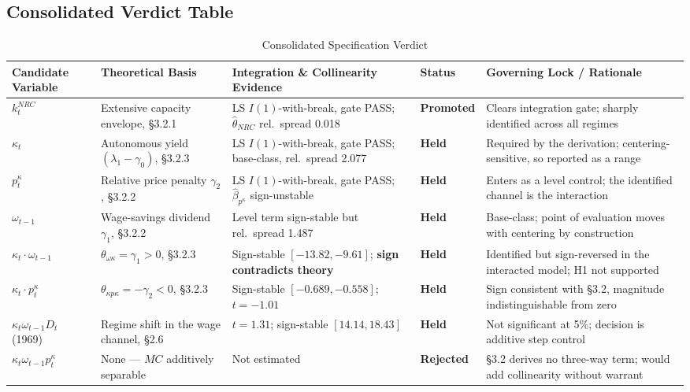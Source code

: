 \documentclass[11pt,a4paper]{article}
\begin{document}
\FloatBarrier
\begin{landscape}
\section{Consolidated Verdict Table}

\begin{table}[H]
\centering
\caption{Consolidated Specification Verdict}
\label{tab:verdict}
\small
\begin{tabular}{p{3.6cm}p{4.4cm}p{6.4cm}p{2.2cm}p{6.0cm}}
\toprule
Candidate Variable & Theoretical Basis & Integration \& Collinearity Evidence & Status & Governing Lock / Rationale \\
\midrule
$k^{NRC}_t$ & Extensive capacity envelope, \S3.2.1 & LS $I(1)$-with-break, gate PASS; $\hat{\theta}_{NRC}$ rel.\ spread 0.018 & \textbf{Promoted} & Clears integration gate; sharply identified across all regimes \\
$\kappa_t$ & Autonomous yield $(\lambda_1-\gamma_0)$, \S3.2.3 & LS $I(1)$-with-break, gate PASS; base-class, rel.\ spread 2.077 & \textbf{Held} & Required by the derivation; centering-sensitive, so reported as a range \\
$p^{\kappa}_t$ & Relative price penalty $\gamma_2$, \S3.2.2 & LS $I(1)$-with-break, gate PASS; $\hat{\beta}_{p^{\kappa}}$ sign-unstable & \textbf{Held} & Enters as a level control; the identified channel is the interaction \\
$\omega_{t-1}$ & Wage-savings dividend $\gamma_1$, \S3.2.2 & Level term sign-stable but rel.\ spread 1.487 & \textbf{Held} & Base-class; point of evaluation moves with centering by construction \\
$\kappa_t \cdot \omega_{t-1}$ & $\theta_{\omega\kappa}=\gamma_1>0$, \S3.2.3 & Sign-stable $[-13.82, -9.61]$; \textbf{sign contradicts theory} & \textbf{Held} & Identified but sign-reversed in the interacted model; H1 not supported \\
$\kappa_t \cdot p^{\kappa}_t$ & $\theta_{\kappa p\kappa}=-\gamma_2<0$, \S3.2.3 & Sign-stable $[-0.689, -0.558]$; $t=-1.01$ & \textbf{Held} & Sign consistent with \S3.2, magnitude indistinguishable from zero \\
$\kappa_t\omega_{t-1}D_t$ (1969) & Regime shift in the wage channel, \S2.6 & $t=1.31$; sign-stable $[14.14, 18.43]$ & \textbf{Held} & Not significant at 5\%; decision is additive step control \\
$\kappa_t\omega_{t-1}p^{\kappa}_t$ & None --- $MC$ additively separable & Not estimated & \textbf{Rejected} & \S3.2 derives no three-way term; would add collinearity without warrant \\

\end{tabular}
\end{table}
\end{landscape}
\end{document}
